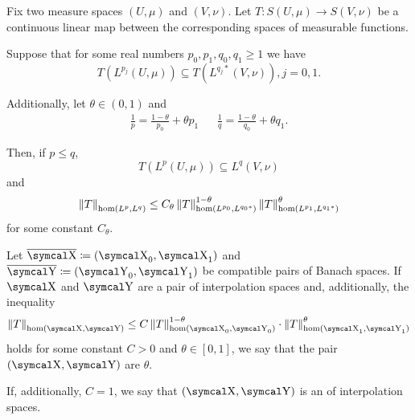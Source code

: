 \begin{theorem}
  Fix two measure spaces \( (U, \mu) \) and \( (V, \nu) \). Let \( T: S(U, \mu) \to S(V, \nu) \) be a continuous linear map between the corresponding spaces of measurable functions.

  Suppose that for some real numbers \( p_0, p_1, q_0, q_1 \geq 1 \) we have
  \begin{equation*}
    T(L^{p_j}(U, \mu)) \subseteq T(L^{q_j *}(V, \nu)), j = 0, 1.
  \end{equation*}

  Additionally, let \( \theta \in (0, 1) \) and
  \begin{align*}
    \frac 1 p = \frac {1 - \theta} {p_0} + {\theta} {p_1}
    &&
    \frac 1 q = \frac {1 - \theta} {q_0} + {\theta} {q_1}.
  \end{align*}

  Then, if \( p \leq q \),
  \begin{equation*}
    T(L^p(U, \mu)) \subseteq L^q(V, \nu)
  \end{equation*}
  and
  \begin{equation*}
    \left\Vert T \right\Vert_{\operatorname{hom}(L^p, L^q)} \leq C_\theta \left\Vert T \right\Vert_{\operatorname{hom}(L^{p_0}, L^{q_0*})}^{1 - \theta} \left\Vert T \right\Vert_{\operatorname{hom}(L^{p_1}, L^{q_1*})}^\theta
  \end{equation*}
  for some constant \( C_\theta \).
\end{theorem}

\begin{definition}\label{thm:banach_interpolation_space_exponent}
  Let \( \Ol{\CX} \coloneqq ( \CX_0, \CX_1 ) \) and \( \Ol{\CY} \coloneqq ( \CY_0, \CY_1 ) \) be compatible pairs of Banach spaces. If \( \CX \) and \( \CY \) are a pair of interpolation spaces and, additionally, the inequality
  \begin{equation*}
    \Norm{T}_{\Hom(\CX, \CY)} \leq C \Norm{T}_{\Hom(\CX_0, \CY_0)}^{1-\theta} \cdot \Norm{T}_{\Hom(\CX_1, \CY_1)}^{\theta}
  \end{equation*}
  holds for some constant \( C > 0 \) and \( \theta \in [0, 1] \), we say that the pair \( (\CX, \CY) \) are  \( \theta \).

  If, additionally, \( C = 1 \), we say that \( (\CX, \CY) \) is an  of interpolation spaces.
\end{definition}

